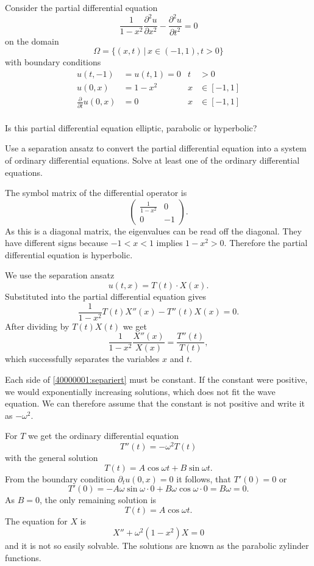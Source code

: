 Consider the partial differential equation
\[
\frac1{1-x^2}\frac{\partial^2 u}{\partial x^2}
-
\frac{\partial^2 u}{\partial t^2}=0
\]
on the domain
\[
\Omega=\{(x,t)\,|\, x\in (-1,1), t>0\}
\]
with boundary conditions
\begin{align*}
u(t,-1)&=u(t,1)=0&t&>0\\
u(0,x)&=1-x^2&x&\in[-1,1]\\
\frac{\partial}{\partial t}u(0,x)&=0&x&\in[-1,1]\\
\end{align*}
\begin{teilaufgaben}
\item
Is this partial differential equation elliptic, parabolic or hyperbolic?
\item
Use a separation ansatz to convert the partial differential equation
into a system of ordinary differential equations.
Solve at least one of the ordinary differential equations.
\end{teilaufgaben}

\begin{loesung}
\begin{teilaufgaben}
\item
The symbol matrix of the differential operator is
\[
\begin{pmatrix}
\frac1{1-x^2}&0\\0&-1
\end{pmatrix}.
\]
As this is a diagonal matrix, the eigenvalues can be read off the diagonal.
They have different signs because $-1<x<1$ implies $1-x^2 >0$.
Therefore the partial differential equation is hyperbolic.
\item
We use the separation ansatz
\[
u(t,x)=T(t)\cdot X(x).
\]
Substituted into the partial differential equation gives
\[
\frac1{1-x^2}T(t)X''(x)-T''(t)X(x)=0.
\]
After dividing by 
$T(t)X(t)$ we get
\begin{equation}
\frac1{1-x^2}\frac{X''(x)}{X(x)}=\frac{T''(t)}{T(t)},
\label{40000001:separiert}
\end{equation}
which successfully separates the variables $x$ and $t$.

Each side of \eqref{40000001:separiert} must be constant.
If the constant were positive, we would exponentially increasing
solutions, which does not fit the wave equation.
We can therefore assume that the constant is not positive
and write it as $-\omega^2$.

For $T$ we get the ordinary differential equation
\[
T''(t)=-\omega^2 T(t)
\]
with the general solution
\[
T(t)=A\cos\omega t+B\sin\omega t.
\]
From the boundary condition $\partial_t u(0,x)=0$ it follows, that
$T'(0)=0$ or
\[
T'(0)=-A\omega\sin\omega \cdot 0+B\omega\cos\omega\cdot 0=B\omega=0.
\]
As $B=0$, the only remaining solution is
\[
T(t)=A\cos\omega t.
\]
The equation for $X$ is
\[
X''+\omega^2(1-x^2)X=0
\]
and it is not so easily solvable.
The solutions are known as the parabolic zylinder functions. 
\qedhere
\end{teilaufgaben}
\end{loesung}

